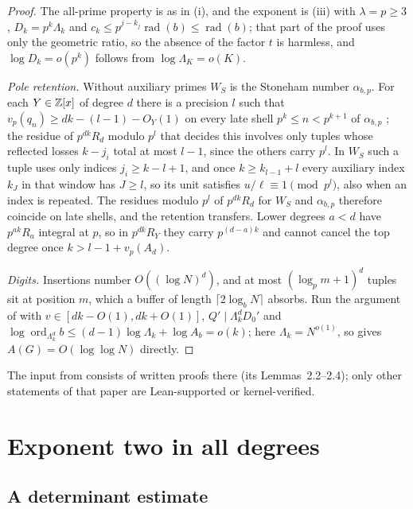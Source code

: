 \documentclass[11pt]{article}
\DeclareMathOperator{\ord}{ord}
\DeclareMathOperator{\rad}{rad}
\begin{document}
\begin{proof}
The all-prime property is as in (i), and the exponent is (iii) with $\lambda=p\ge3$,
$D_k=p^k\Lambda_k$ and $c_k\le p^{j-k_j}\rad(b)\le\rad(b)$; that part of the proof uses only the geometric ratio, so the absence of the
factor $t$ is harmless, and $\log D_k=o(p^k)$ follows from $\log\Lambda_K=o(K)$.

\emph{Pole retention.} Without auxiliary primes $W_S$ is the Stoneham number $\alpha_{b,p}$. For each $Y\in\mathbb Z[x]$ of degree $d$ there
is a precision $l$ such that $v_p(q_n)\ge dk-(l-1)-O_Y(1)$ on every late shell $p^k\le n<p^{k+1}$ of $\alpha_{b,p}$
\cite[Lemmas~2.2--2.4]{PaperIv2}; the residue of $p^{dk}R_d$ modulo $p^l$ that decides this involves only tuples whose reflected
losses $k-j_i$ total at most $l-1$, since the others carry $p^l$. In $W_S$ such a tuple uses only indices $j_i\ge k-l+1$, and
once $k\ge k_{l-1}+l$ every auxiliary index $k_J$ in that window has $J\ge l$, so its unit satisfies $u/\ell\equiv1\pmod{p^l}$, also when an
index is repeated. The residues modulo $p^l$ of $p^{dk}R_d$ for $W_S$ and $\alpha_{b,p}$ therefore coincide on late shells, and the
retention transfers. Lower degrees $a<d$ have $p^{ak}R_a$ integral at $p$, so in $p^{dk}R_Y$ they carry $p^{(d-a)k}$ and cannot
cancel the top degree once $k>l-1+v_p(A_d)$.

\emph{Digits.} Insertions number $O((\log N)^d)$, and at most $(\log_pm+1)^d$ tuples sit at position $m$, which a buffer of length
$\lceil2\log_bN\rceil$ absorbs. Run the argument of  with $v\in[dk-O(1),dk+O(1)]$, $Q'\mid\Lambda_k^dD_0'$ and
$\log\ord_{\Lambda_k^d}b\le(d-1)\log\Lambda_k+\log A_b=o(k)$; here $\Lambda_k=N^{o(1)}$, so  gives $A(G)=O(\log\log N)$ directly.
\end{proof}

The input from \cite{PaperIv2} consists of written proofs there (its Lemmas~2.2--2.4); only other statements of that
paper are Lean-supported or kernel-verified.

\section{Exponent two in all degrees}\label{sec:two}

\subsection{A determinant estimate}
\end{document}
